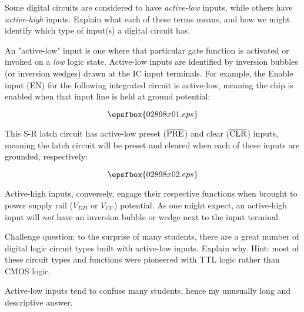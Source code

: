 

Some digital circuits are considered to have {\it active-low} inputs, while others have {\it active-high} inputs.  Explain what each of these terms means, and how we might identify which type of input(s) a digital circuit has.







An "active-low" input is one where that particular gate function is activated or invoked on a {\it low} logic state.  Active-low inputs are identified by inversion bubbles (or inversion wedges) drawn at the IC input terminals.  For example, the Enable input (EN) for the following integrated circuit is active-low, meaning the chip is enabled when that input line is held at ground potential:

$$\epsfbox{02898x01.eps}$$

This S-R latch circuit has active-low preset ($\overline{\hbox{PRE}}$) and clear ($\overline{\hbox{CLR}}$) inputs, meaning the latch circuit will be preset and cleared when each of these inputs are grounded, respectively:

\goodbreak

$$\epsfbox{02898x02.eps}$$

Active-high inputs, conversely, engage their respective functions when brought to power supply rail ($V_{DD}$ or $V_{CC}$) potential.  As one might expect, an active-high input will {\it not} have an inversion bubble or wedge next to the input terminal.

\vskip 10pt

Challenge question: to the surprise of many students, there are a great number of digital logic circuit types built with active-low inputs.  Explain why.  Hint: most of these circuit types and functions were pioneered with TTL logic rather than CMOS logic.







Active-low inputs tend to confuse many students, hence my unusually long and descriptive answer.




